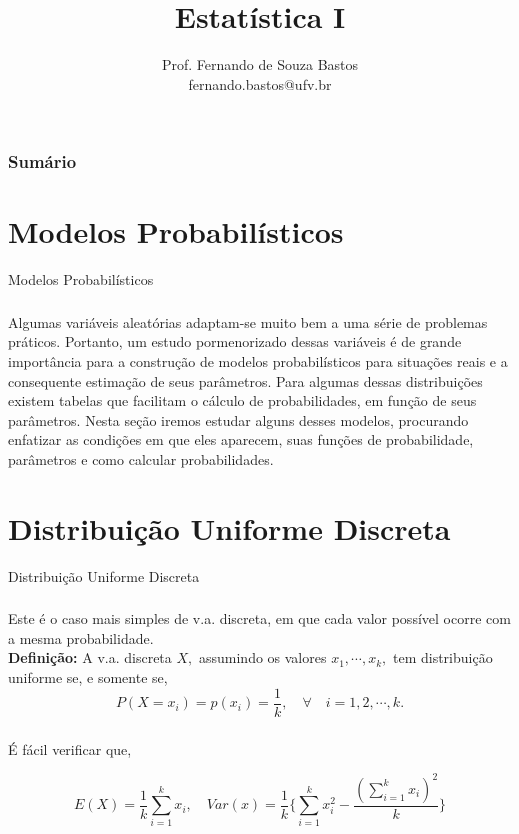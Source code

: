 \documentclass[14pt,aspectratio=1610]{beamer}
\title{Estatística I}
\author{Prof. Fernando de Souza Bastos \texorpdfstring{\\ fernando.bastos@ufv.br}{}}
\institute{Departamento de Estatística \texorpdfstring{\\ Universidade Federal de Viçosa}{}\texorpdfstring{\\ Campus UFV - Viçosa}{}}
\date{}
\begin{document}
%

\frame{\titlepage}

\begin{frame}{}
\frametitle{\bf Sumário}
\tableofcontents
\end{frame}

\section{Modelos Probabilísticos}
\begin{frame}{Modelos Probabilísticos}
\frametitle{}
\begin{block}{}
\justifying
Algumas variáveis aleatórias adaptam-se muito bem a uma série de problemas
práticos. Portanto, um estudo pormenorizado dessas variáveis é de grande importância
para a construção de modelos probabilísticos para si\-tua\-ções reais e a consequente
estimação de seus parâmetros. Para algumas dessas distribuições existem tabelas que
facilitam o cálculo de probabilidades, em função de seus parâmetros. Nesta seção
iremos estudar alguns desses modelos, procurando enfatizar as condições em que eles
aparecem, suas funções de probabilidade, parâmetros e como calcular probabilidades.
\end{block}
\end{frame}

\section{Distribuição Uniforme Discreta}
\begin{frame}{Distribuição Uniforme Discreta}
\frametitle{}
\begin{block}{}
\justifying
Este é o caso mais simples de v.a. discreta, em que cada valor possível ocorre com
a mesma probabilidade.\\
{\bf Definição:} A v.a. discreta $X,$ assumindo os valores $x_{1},\cdots, x_{k},$ tem distribuição uniforme se, e somente se,
$$P(X=x_{i})=p(x_{i})=\dfrac{1}{k},\quad \forall\quad i=1,2,\cdots,k.$$
\end{block}
\end{frame}

\begin{frame}{}
\frametitle{}
\begin{block}{}
\justifying
É fácil verificar que,

$$
E(X)=\dfrac{1}{k}{\displaystyle \sum_{i=1}^{k}x_{i}},\quad 
Var(x)=\dfrac{1}{k}\Biggl\{{\displaystyle \sum_{i=1}^{k}x_{i}^{2}}-\dfrac{{\displaystyle\left(\sum_{i=1}^{k}x_{i}\right)^{2}}}{k} \Biggl\}
$$

\end{block}
\end{frame}
\end{document}
